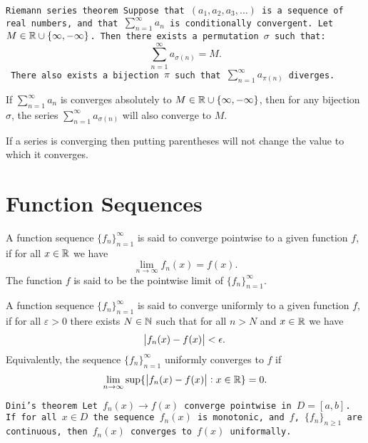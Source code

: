 \documentclass[11pt,a4paper]{article}
\begin{document}
  \begin{theorem}\tt{Riemann series theorem}
    Suppose that $(a_{1}, a_{2}, a_{3}, \ldots)$ is a sequence of real numbers, 
    and that $\sum_{n=1}^{\infty} a_n$ is conditionally convergent. 
    Let $M \in \mathbb{R} \cup \{\infty,-\infty\}$.
    Then there exists a permutation $\sigma$ such that:
    \[
      \sum_{n=1}^{\infty} a_{\sigma(n)} = M.
    \] 
    There also exists a bijection $\pi$ such that
    $\sum_{n=1}^{\infty} a_{\pi(n)}$ diverges.
  \end{theorem}
  \begin{remark}
    If $\sum_{n=1}^{\infty} a_n$ is converges absolutely to 
    $M \in \mathbb{R} \cup \{\infty, -\infty\}$,
    then for any bijection $\sigma$, the series
    $\sum_{n=1}^{\infty} a_{\sigma(n)}$ will also converge to $M$.
  \end{remark}
  \begin{remark}
    If a series is converging then putting parentheses will not change the
    value to which it converges.
  \end{remark}

  \newpage
  
  \section{Function Sequences}
  \begin{definition}
    A function sequence $\{f_n\}_{n=1}^{\infty}$ is said to converge
    pointwise to a given function $f$, if for all $x \in \mathbb{R}$ we have
    \[
      \lim _{n \to \infty } f_{n}(x) = f(x).
    \]
    The function $f$ is said to be the pointwise limit of
    $\{f_n\}_{n=1}^{\infty}$.
  \end{definition}

  \begin{definition}
    A function sequence $\{f_n\}_{n=1}^{\infty}$ is said to converge
    uniformly to a given function $f$, if for all $\varepsilon > 0$ there
    exists $N \in \mathbb{N}$ such that for all $n > N$ and $x \in \mathbb{R}$ we have
    \[
      \abs{f_{n}(x) - f(x)} < \epsilon.
    \]
    Equivalently, the sequence $\{f_n\}_{n=1}^{\infty}$ uniformly converges
    to $f$ if
    \[
      \lim_{n \to \infty }
      \sup\{\,\abs{f_{n}(x) - f(x)}:x\in \mathbb{R}\} = 0.
    \]
  \end{definition}

  \begin{theorem}\tt{Dini's theorem}
    Let $f_n(x)\to f(x)$ converge pointwise in $D = [a,b]$.
    If for all $x \in D$ the sequence $f_n(x)$ is monotonic,
    and $f$, $\{f_n\}_{n \geq 1}$ are continuous,
    then $f_n(x)$ converges to $f(x)$ uniformally.
  \end{theorem}
\end{document}
